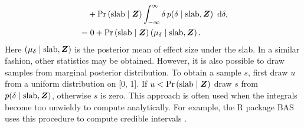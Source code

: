 \documentclass[a4paper]{article}
\newcommand{\shypo}[1]{%
	\ifnum#1>0%
		\mathrm{slab}
	\else%
		\mathrm{spike}
	\fi%
}
\newcommand{\dataZ}	{\bm{Z}}
\newcommand{\probo}{\mathrm{Pr}}
\newcommand{\prob}[1]{\probo\left(#1\right)}
\newcommand{\dx}[1]{\enspace\mathrm{d}{#1}}
\newenvironment{revision}{\color{black}}{\color{black}}
\begin{document}
\begin{revision}
\begin{align*}
	&\quad+ \prob{\shypo{1}\mid \dataZ}\int_{-\infty}^\infty\delta \, p(\delta\mid\shypo{1}, \dataZ) \dx{\delta}, \\
	&=
	0 + 
	\prob{\shypo{1}\mid \dataZ} \left(\mu_{\delta} \mid\shypo{1}, \dataZ\right).
\end{align*}
Here $\left(\mu_{\delta} \mid\shypo{1}, \dataZ\right)$ is the posterior mean of effect size under the slab. In a similar fashion, other statistics may be obtained. However, it is also possible to draw samples from marginal posterior distribution. To obtain a sample $s$, first draw $u$ from a uniform distribution on [0, 1]. If $u<\prob{\shypo{1}\mid \dataZ}$ draw $s$ from $p(\delta\mid\shypo{1}, \dataZ)$, otherwise $s$ is zero. This approach is often used when the integrals become too unwieldy to compute analytically. For example, the R package BAS uses this procedure to compute credible intervals \parencite{ClydeEtAl2011}.

\end{revision}
\end{document}
